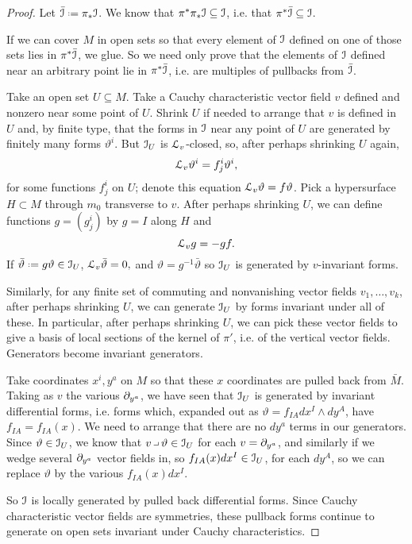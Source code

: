 \begin{proof}
Let \(\bar\II\defeq\pi_*\II\).
We know that \(\pi^*\pi_*\mathcal{I}\subseteq\mathcal{I}\), i.e. that \(\pi^*\bar{\mathcal{I}}\subseteq\mathcal{I}\).

If we can cover \(M\) in open sets so that every element of \(\mathcal{I}\) defined on one of those sets lies in \(\pi^*\bar{\mathcal{I}}\), we glue.
So we need only prove that the elements of \(\mathcal{I}\) defined near an arbitrary point lie in \(\pi^*\bar{\mathcal{I}}\), i.e. are multiples of pullbacks from \(\bar{\mathcal{I}}\).

Take an open set \(U\subseteq M\).
Take a Cauchy characteristic vector field \(v\) defined and nonzero near some point of \(U\).
Shrink \(U\) if needed to  arrange that \(v\) is defined in \(U\) and, 
by finite type, that the forms in \(\mathcal{I}\) near any point of \(U\) are generated by finitely many forms \(\vartheta^i\).
But \(\mathcal{I}_U\) is \(\EuScript L_v\)-closed, so, after perhaps shrinking \(U\) again,
\[
\EuScript L_v \vartheta^i = f^i_j \vartheta^i,
\]
for some functions \(f^i_j\) on \(U\); denote this equation \(\EuScript L_v \vartheta=f\vartheta\).
Pick a hypersurface \(H \subset M\) through \(m_0\) transverse to \(v\).
After perhaps shrinking \(U\), we can define functions \(g=(g^i_j)\) by \(g=I\) along \(H\) and 
\[
\EuScript L_v g = -gf.
\]
If \(\bar\vartheta\defeq g\vartheta\in\II_U\),
\(
\EuScript L_v \bar\vartheta=0,
\)
and \(\vartheta=g^{-1}\bar\vartheta\) so \(\mathcal{I}_U\) is generated by \(v\)-invariant forms.

Similarly, for any finite set of commuting and nonvanishing vector fields \(v_1,\dots,v_k\), after perhaps shrinking \(U\), we can generate \(\mathcal{I}_U\) by forms invariant under all of these.
In particular, after perhaps shrinking \(U\), we can pick these vector fields to give a basis of local sections of the kernel of \(\pi'\), i.e. of the vertical vector fields.
Generators become invariant generators.

Take coordinates \(x^i,y^a\) on \(M\) so that these \(x\) coordinates are pulled back from \(\bar{M}\).
Taking as \(v\) the various \(\partial_{y^a}\), we have seen that \(\mathcal{I}_U\) is generated by invariant differential forms, i.e. forms which, expanded out as \(\vartheta = f_{IA} dx^I \wedge dy^A\), have \(f_{IA} = f_{IA}(x)\).
We need to arrange that there are no \(dy^a\) terms in our generators.
Since \(\vartheta \in \mathcal{I}_U\), we know that \(v \hook \vartheta \in \II_U\) for each \(v=\partial_{y^a}\), and similarly if we wedge several \(\partial_{y^a}\) vector fields in, so \(f_{IA}(x) dx^I \in \mathcal{I}_U\), for each \(dy^A\), so we can replace \(\vartheta\) by the various \(f_{IA}(x) dx^I\).

So \(\mathcal{I}\) is locally generated by pulled back differential forms.
Since Cauchy characteristic vector fields are symmetries, these pullback forms continue to generate on open sets invariant under Cauchy characteristics.
\end{proof}
